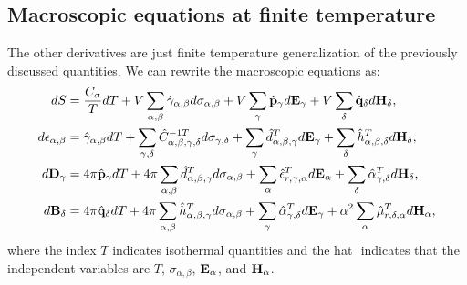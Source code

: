 \documentclass[12pt,a4paper]{article}
\begin{document}
{\subsection{\color{web-blue}Macroscopic equations at finite temperature}

The other derivatives are just finite temperature generalization of the
previously discussed quantities. We can rewrite the macroscopic equations as:
\begin{align}
dS&= {C_\sigma\over T} dT+ V \sum_{\alpha,\beta} \hat \gamma_{\alpha,\beta} 
d\sigma_{\alpha,\beta}
+ V \sum_\gamma \hat {\bf p}_\gamma d{\bf E}_{\gamma} + 
V \sum_\delta \hat {\bf q}_\delta d{\bf H}_{\delta}, \\
d\epsilon_{\alpha,\beta}&= \hat \gamma_{\alpha,\beta} dT + 
\sum_{\gamma,\delta} \hat C^{-1 T}_{\alpha,\beta,\gamma,\delta} 
d \sigma_{\gamma,\delta} + \sum_\gamma \hat d^T_{\alpha,\beta,\gamma} 
d{\bf E}_{\gamma} +
\sum_\delta \hat h^T_{\alpha,\beta,\delta} d{\bf H}_{\delta}, \\
d{\bf D}_\gamma&= 
4 \pi \hat {\bf p}_\gamma dT + 4 \pi \sum_{\alpha,\beta} \hat 
d^T_{\alpha,\beta,\gamma} d\sigma_{\alpha,\beta}
+ \sum_\alpha \hat \epsilon^T_{r,\gamma,\alpha} d{\bf E}_{\alpha} + 
\sum_\delta \hat \alpha^T_{\gamma,\delta} d{\bf H}_{\delta}, \\
d{\bf B}_\delta&= 
4 \pi \hat {\bf q}_\delta dT+ 4 \pi \sum_{\alpha,\beta}
\hat h^T_{\alpha,\beta,\gamma}
d\sigma_{\alpha,\beta}
+\sum_\gamma \hat \alpha^T_{\gamma,\delta}
d{\bf E}_{\gamma}+ \alpha^2
\sum_\alpha \hat \mu^T_{r,\delta,\alpha}
d{\bf H}_{\alpha}, 
\end{align}
where the index $T$ indicates isothermal quantities and the hat $\hat{}$
indicates that the independent variables are $T$, $\sigma_{\alpha,\beta}$, 
${\bf E}_\alpha$, and ${\bf H}_\alpha$.  
}
\end{document}
